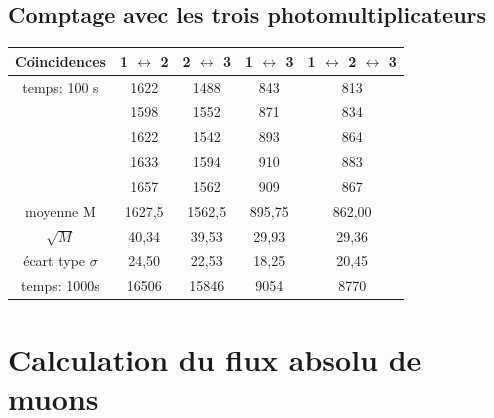\documentclass[a4paper,11pt,liststotocnumbered,bibtotocnumbered]{scrartcl}
\begin{document}
\subsection{Comptage avec les trois photomultiplicateurs}
\begin{tabular}{c|c|c|c|c}
Co\"{\i}ncidences	&	 1 $\leftrightarrow$ 2	&	 2 $\leftrightarrow$ 3	&	 1 $\leftrightarrow$ 3	&	1 $\leftrightarrow$ 2 $\leftrightarrow$ 3	\\ \hline
temps: 100 s	&	1622	&	1488	&	843	&	813	\\
	&	1598	&	1552	&	871	&	834	\\
	&	1622	&	1542	&	893	&	864	\\
	&	1633	&	1594	&	910	&	883	\\
	&	1657	&	1562	&	909	&	867	\\ \hline
moyenne M	&	1627,5	&	1562,5	&	895,75	&	862,00	\\
$\sqrt M$	&	40,34	&	39,53	&	29,93	&	29,36	\\
écart type $\sigma$	&	24,50	&	22,53	&	18,25	&	20,45	\\ \hline
temps: 1000s	&	16506	&	15846	&	9054	&	8770	\\
\end{tabular}


 \section{Calculation du flux absolu de muons}
\end{document}
